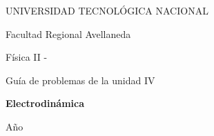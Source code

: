 \begin{titlepage}
    \begin{center}
    \vspace{1.5cm}
    

    \end{center}

    \begin{center}
        {\LARGE UNIVERSIDAD TECNOLÓGICA NACIONAL}\par\medskip
        \vspace*{0.25cm}
        {\LARGE Facultad Regional Avellaneda}\par\medskip
        \vspace*{1cm}
        {\Huge Física II - \comision}\par\medskip
        \vspace*{0.5cm}
        {\LARGE Guía de problemas de la unidad IV}\par\bigskip
        \vspace*{1cm}
        {\Huge \bf \color[RGB]{0,121,138} Electrodinámica\par\medskip}
    \end{center}

    \vspace{1cm}

    \begin{center}
        \begin{minipage}[t]{.7\textwidth}
            \renewcommand*{\contentsname}{Contenidos}
            \tableofcontents
        \end{minipage}
        \vspace*{\fill}
    \end{center}
    \begin{center}
        Año \anio
    \end{center}

    \end{titlepage}


